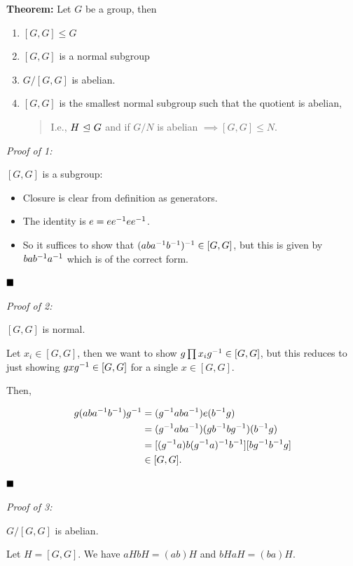 \textbf{Theorem:} Let \(G\) be a group, then

\begin{enumerate}
\def\labelenumi{\arabic{enumi}.}
\item
  \([G,G] \leq G\)
\item
  \([G,G]\) is a normal subgroup
\item
  \(G/[G, G]\) is abelian.
\item
  \([G,G]\) is the smallest normal subgroup such that the quotient is
  abelian,

  \begin{quote}
  I.e., \(H {~\trianglelefteq~} G\) and if \(G/N\) is abelian
  \(\implies [G, G] \leq N\).
  \end{quote}
\end{enumerate}

\emph{Proof of 1:}

\([G, G]\) is a subgroup:

\begin{itemize}
\tightlist
\item
  Closure is clear from definition as generators.
\item
  The identity is \(e = e e^{-1} e e^{-1}\).
\item
  So it suffices to show that \((aba^{-1} b^{-1})^{-1} \in [G, G]\), but
  this is given by \(bab^{-1} a^{-1}\) which is of the correct form.
\end{itemize}

\(\qed\)

\emph{Proof of 2:}

\([G, G]\) is normal.

Let \(x_i \in [G, G]\), then we want to show
\(g \prod x_i g^{-1} \in [G, G]\), but this reduces to just showing
\(gx g^{-1} \in [G, G]\) for a single \(x\in [G, G]\).

Then,

\begin{align*}
g(aba^{-1} b^{-1} ) g^{-1} &= (g^{-1} aba^{-1}) e (b^{-1} g) \\
&= (g^{-1} aba^{-1})(gb^{-1} b g^{-1})(b^{-1} g) \\
&= [(g^{-1} a)b (g^{-1} a)^{-1} b^{-1}] [bg^{-1} b^{-1} g] \\
&\in [G, G]
.\end{align*}

\(\qed\)

\emph{Proof of 3:}

\(G/[G, G]\) is abelian.

Let \(H = [G, G]\). We have \(aH bH = (ab) H\) and \(bH aH = (ba)H\).

